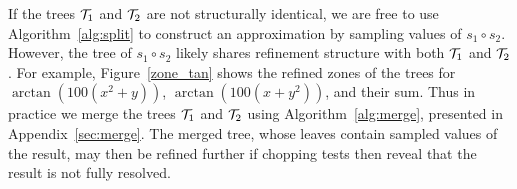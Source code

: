 If the trees $\mathcal{T}_1$ and $\mathcal{T}_2$ are not structurally identical, we are free to use Algorithm~\ref{alg:split} to construct an approximation by sampling values of ${s}_1 \circ {s}_2$. However, the tree of ${s}_1 \circ {s}_2$ likely shares refinement structure with both $\mathcal{T}_1$ and $\mathcal{T}_2$. For example, Figure~\ref{zone_tan} shows the refined zones of the trees for $\arctan(100(x^2+y))$, $\arctan(100(x+y^2))$, and their sum. Thus in practice we merge the trees $\mathcal{T}_1$ and $\mathcal{T}_2$ using Algorithm~\ref{alg:merge}, presented in Appendix~\ref{sec:merge}. The merged tree, whose leaves contain sampled values of the result, may then be refined further if chopping tests then reveal that the result is not fully resolved. 

\begin{figure}
\centering
{}
 

\end{figure}
